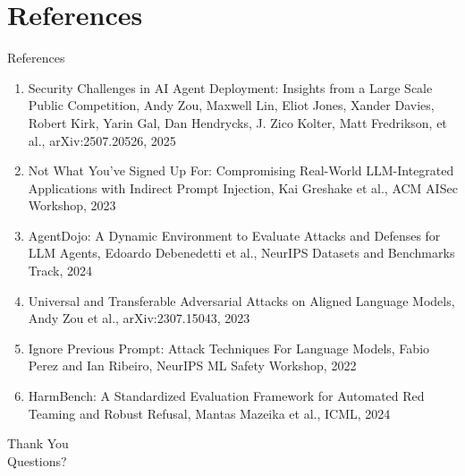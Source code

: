 \documentclass[10pt]{beamer}
\begin{document}
\section{References}
\begin{frame}[allowframebreaks]{References}
  \footnotesize
  \begin{enumerate}
    \item Security Challenges in AI Agent Deployment: Insights from a Large Scale Public Competition, Andy Zou, Maxwell Lin, Eliot Jones, Xander Davies, Robert Kirk, Yarin Gal, Dan Hendrycks, J. Zico Kolter, Matt Fredrikson, et al., arXiv:2507.20526, 2025
    \item Not What You've Signed Up For: Compromising Real-World LLM-Integrated Applications with Indirect Prompt Injection, Kai Greshake et al., ACM AISec Workshop, 2023
    \item AgentDojo: A Dynamic Environment to Evaluate Attacks and Defenses for LLM Agents, Edoardo Debenedetti et al., NeurIPS Datasets and Benchmarks Track, 2024
    \item Universal and Transferable Adversarial Attacks on Aligned Language Models, Andy Zou et al., arXiv:2307.15043, 2023
    \item Ignore Previous Prompt: Attack Techniques For Language Models, Fabio Perez and Ian Ribeiro, NeurIPS ML Safety Workshop, 2022
    \item HarmBench: A Standardized Evaluation Framework for Automated Red Teaming and Robust Refusal, Mantas Mazeika et al., ICML, 2024
  \end{enumerate}
\end{frame}

\begin{frame}[plain]
  \begin{center}
    {\Huge Thank You}\\[1em]
    {\large Questions?}
  \end{center}
\end{frame}
\end{document}
